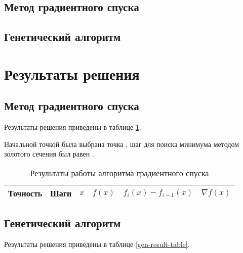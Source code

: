 \documentclass[10pt,a4paper,titlepage]{article}
\begin{document}
\subsection{Метод градиентного спуска}
\lstset{language=C++, caption=Градиентный спуск,%
label=gd-source-code, basicstyle=\footnotesize,%
numbers=left, numberstyle=\footnotesize, numbersep=5pt, frame=single, breaklines=true, breakatwhitespace=false,%
inputencoding=utf8x}


\subsection{Генетический алгоритм}
\lstset{language=C++, caption=Генетический алгоритм,%
label=gen-source-code, basicstyle=\footnotesize,%
numbers=left, numberstyle=\footnotesize, numbersep=5pt, frame=single, breaklines=true, breakatwhitespace=false,%
inputencoding=utf8x}


\section{Результаты решения}
\subsection{Метод градиентного спуска}
Результаты решения приведены в таблице \ref{gd-result-table}.

Начальной точкой была выбрана точка \!, %
шаг для поиска минимума методом золотого сечения был равен \!. %

\begin{table}[H]
\caption{Результаты работы алгоритма градиентного спуска}
\label{gd-result-table}
\begin{center}
\begin{tabular}{|c|c|c|c|c|c|}
\hline
Точность & Шаги & $x$ & $f(x)$ & $f_i(x) - f_{i - 1}(x)$ & $\nabla f(x)$\\
\hline

\hline
\end{tabular}
\end{center}
\end{table}

\subsection{Генетический алгоритм}
Результаты решения приведены в таблице \ref{gen-result-table}.
\end{document}
